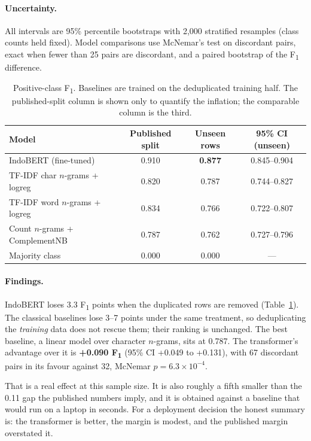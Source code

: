 \documentclass[10pt,a4paper]{article}
\newcommand{\fone}{F\textsubscript{1}}
\begin{document}
\paragraph{Uncertainty.}
All intervals are 95\% percentile bootstraps with 2{,}000 stratified resamples (class counts held
fixed). Model comparisons use McNemar's test on discordant pairs, exact when fewer than 25 pairs
are discordant, and a paired bootstrap of the \fone{} difference.

\begin{table}[t]
  \centering
  \small
  \begin{tabular}{lccc}
    \toprule
    Model & Published split & Unseen rows & 95\% CI (unseen) \\
    \midrule
    IndoBERT (fine-tuned)            & 0.910 & \textbf{0.877} & 0.845--0.904 \\
    TF-IDF char $n$-grams + logreg   & 0.820 & 0.787 & 0.744--0.827 \\
    TF-IDF word $n$-grams + logreg   & 0.834 & 0.766 & 0.722--0.807 \\
    Count $n$-grams + ComplementNB   & 0.787 & 0.762 & 0.727--0.796 \\
    Majority class                   & 0.000 & 0.000 & --- \\
    \bottomrule
  \end{tabular}
  \caption{Positive-class \fone. Baselines are trained on the deduplicated training half.
  The published-split column is shown only to quantify the inflation; the comparable column is
  the third.}
  \label{tab:main}
\end{table}

\paragraph{Findings.}
IndoBERT loses 3.3 \fone{} points when the duplicated rows are removed (Table~\ref{tab:main}).
The classical baselines lose 3--7 points under the same treatment, so deduplicating the
\emph{training} data does not rescue them; their ranking is unchanged. The best baseline, a linear
model over character $n$-grams, sits at 0.787. The transformer's advantage over it is
\textbf{+0.090 \fone} (95\% CI +0.049 to +0.131), with 67 discordant pairs in its favour against
32, McNemar $p=6.3\times10^{-4}$.

That is a real effect at this sample size. It is also roughly a fifth smaller than the 0.11 gap the
published numbers imply, and it is obtained against a baseline that would run on a laptop in
seconds. For a deployment decision the honest summary is: the transformer is better, the margin is
modest, and the published margin overstated it.
\end{document}
